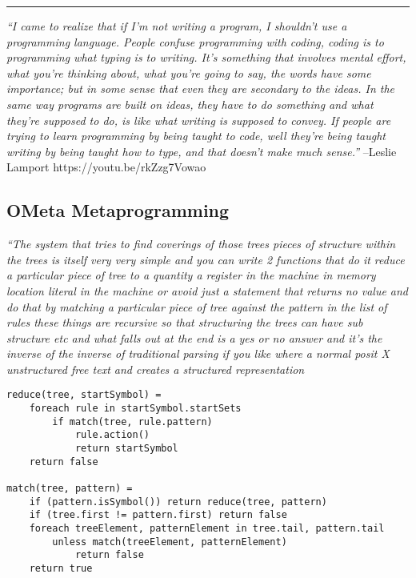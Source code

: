 \begin{center}\rule{0.5\linewidth}{0.5pt}\end{center}

\emph{``I came to realize that if I'm not writing a program, I shouldn't
use a programming language. People confuse programming with coding,
coding is to programming what typing is to writing. It's something that
involves mental effort, what you're thinking about, what you're going to
say, the words have some importance; but in some sense that even they
are secondary to the ideas. In the same way programs are built on ideas,
they have to do something and what they're supposed to do, is like what
writing is supposed to convey. If people are trying to learn programming
by being taught to code, well they're being taught writing by being
taught how to type, and that doesn't make much sense.''} --Leslie
Lamport https://youtu.be/rkZzg7Vowao

\hypertarget{ometa-metaprogramming}{%
\subsection{\texorpdfstring{\textbf{OMeta}
Metaprogramming}{OMeta Metaprogramming}}\label{ometa-metaprogramming}}

\emph{``The system that tries to find coverings of those trees pieces of
structure within the trees is itself very very simple and you can write
2 functions that do it reduce a particular piece of tree to a quantity a
register in the machine in memory location literal in the machine or
avoid just a statement that returns no value and do that by matching a
particular piece of tree against the pattern in the list of rules these
things are recursive so that structuring the trees can have sub
structure etc and what falls out at the end is a yes or no answer and
it's the inverse of the inverse of traditional parsing if you like where
a normal posit X unstructured free text and creates a structured
representation}

\begin{verbatim}
reduce(tree, startSymbol) =
    foreach rule in startSymbol.startSets
        if match(tree, rule.pattern)
            rule.action()
            return startSymbol
    return false

match(tree, pattern) =
    if (pattern.isSymbol()) return reduce(tree, pattern)
    if (tree.first != pattern.first) return false
    foreach treeElement, patternElement in tree.tail, pattern.tail
        unless match(treeElement, patternElement)
            return false
    return true
\end{verbatim}

